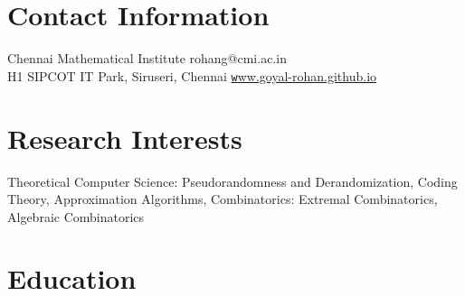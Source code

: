 \documentclass[margin,line, 10pt]{res}
\newenvironment{list2}{
  \begin{list}{$\bullet$}{%
      \setlength{\itemsep}{0in}
      \setlength{\parsep}{0in} \setlength{\parskip}{0in}
      \setlength{\topsep}{0in} \setlength{\partopsep}{0in} 
      \setlength{\leftmargin}{0.2in}}}{\end{list}}
\begin{document}

\begin{resume}
\section{\sc Contact Information}
Chennai Mathematical Institute \hfill {rohang@cmi.ac.in}\\
H1 SIPCOT IT Park, Siruseri, Chennai \hfill \href{https://goyal-rohan.github.io/}{\texttt www.goyal-rohan.github.io}

\section{\sc Research Interests}
Theoretical Computer Science: Pseudorandomness and Derandomization, Coding Theory, Approximation Algorithms, Combinatorics: Extremal Combinatorics, Algebraic Combinatorics

\section{\sc Education}







\end{resume}
\end{document}
